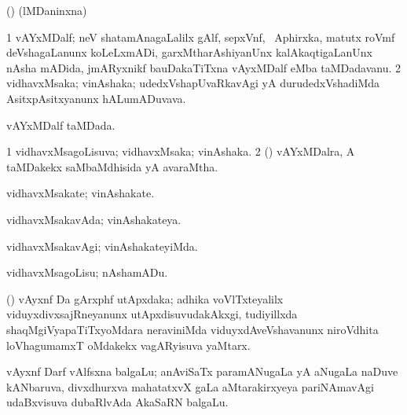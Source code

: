 \bentry
{}
\gl{\saMkiSx}
\expl{}
\bmng
 (\birx) (lMDaninxna)  
\emng
\eentry

\bentry
{} 
\gl{\nA}
\expl{}
\bmng
\bnum
\num{1}  vAYxMDalf; neV shatamAnagaLalilx gAlf, sepxVnf, \kanu\ Aphirxka, matutx roVmf deVshagaLanunx koLeLxmADi, garxMtharAshiyanUnx kalAkaqtigaLanUnx nAsha mADida, jmARyxnikf bauDakaTiTxna vAyxMDalf eMba taMDadavanu. 
\num{2} vidhavxMsaka; vinAshaka; udedxVshapUvaRkavAgi yA durudedxVshadiMda AsitxpAsitxyanunx hALumADuvava. 
\enum
\emng
\eentry

\bentry
{} 
\gl{\gu}
\expl{}
\bmng
 vAYxMDalf taMDada. 
\emng
\eentry

\bentry
{} 
\gl{\gu}
\expl{}
\bmng
\bnum
\num{1} vidhavxMsagoLisuva; vidhavxMsaka; vinAshaka. 
\num{2} () vAYxMDalra, A taMDakekx saMbaMdhisida yA avaraMtha. 
\enum
\emng
\eentry

\bentry
{} 
\gl{\nA}
\expl{}
\bmng
 vidhavxMsakate; vinAshakate. 
\emng
\eentry

\bentry
{} 
\gl{\gu}
\expl{}
\bmng
 vidhavxMsakavAda; vinAshakateya. 
\emng
\eentry

\bentry
{} 
\gl{\kirxvi}
\expl{}
\bmng
 vidhavxMsakavAgi; vinAshakateyiMda. 
\emng
\eentry

\bentry
{} 
\gl{\sakirx}
\expl{}
\bmng
 vidhavxMsagoLisu; nAshamADu. 
\emng
\eentry

\bentry
{} 
\gl{\nA}
\expl{}
\bmng
 (\viduyx) vAyxnf Da gArxphf utApxdaka; adhika voVlTxteyalilx viduyxdivxsajRneyanunx utApxdisuvudakAkxgi, tudiyillxda shaqMgiVyapaTiTxyoMdara neraviniMda viduyxdAveVshavanunx niroVdhita  loVhagumamxT oMdakekx vagARyisuva yaMtarx. 
\emng
\eentry

\bentry
{}
\gl{\nA}
\expl{(\bava) (\ravi)}
\bmng
 vAyxnf Darf vAlfsxna balgaLu; anAviSaTx paramANugaLa yA aNugaLa naDuve kANbaruva, divxdhurxva mahatatxvX  gaLa aMtarakirxyeya pariNAmavAgi udaBxvisuva dubaRlvAda AkaSaRN balgaLu. 
\emng
\eentry


